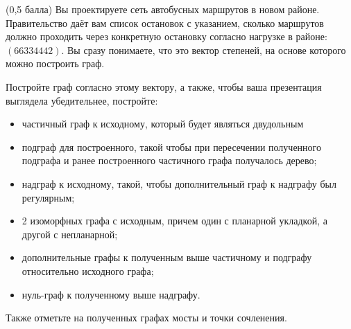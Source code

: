 \question
(0,5 балла) Вы проектируете сеть автобусных маршрутов в новом районе. Правительство даёт вам список остановок с указанием, сколько маршрутов должно проходить через конкретную остановку согласно нагрузке в районе: $(6 6 3 3 4 4 4 2)$. Вы сразу понимаете, что это вектор степеней, на основе которого можно построить граф.

Постройте граф согласно этому вектору, а также, чтобы ваша презентация выглядела убедительнее, постройте:

\begin{itemize}
\item частичный граф к исходному, который будет являться двудольным
\item подграф для построенного, такой чтобы при пересечении полученного подграфа и ранее построенного частичного графа получалось дерево;
\item надграф к исходному, такой, чтобы дополнительный граф к надграфу был регулярным;
\item 2 изоморфных графа с исходным, причем один с планарной укладкой, а другой с непланарной;
\item дополнительные графы к полученным выше частичному и подграфу относительно исходного графа;
\item нуль-граф к полученному выше надграфу.
\end{itemize}

Также отметьте на полученных графах мосты и точки сочленения.

